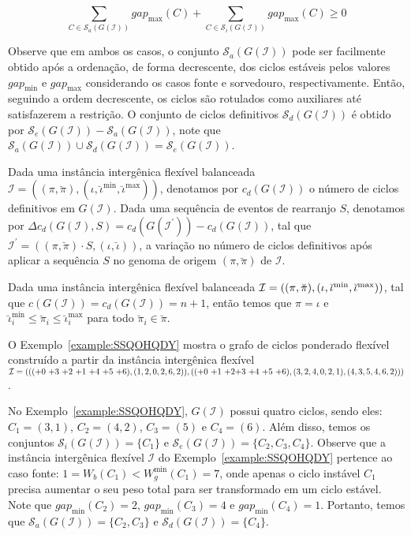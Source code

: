 $$\sum_{C \in \mathcal{S}_a(G(\mathcal{I}))} gap_{\max}(C) + \sum_{C \in \mathcal{S}_i(G(\mathcal{I}))} gap_{\max}(C) \ge 0$$

Observe que em ambos os casos, o conjunto $\mathcal{S}_a(G(\mathcal{I}))$ pode ser facilmente obtido após a ordenação, de forma decrescente, dos ciclos estáveis pelos valores $gap_{\min}$ e $gap_{\max}$ considerando os casos fonte e sorvedouro, respectivamente. Então, seguindo a ordem decrescente, os ciclos são rotulados como auxiliares até satisfazerem a restrição. O conjunto de ciclos definitivos $\mathcal{S}_d(G(\mathcal{I}))$ é obtido por $\mathcal{S}_e(G(\mathcal{I})) - \mathcal{S}_a(G(\mathcal{I}))$, note que $\mathcal{S}_a(G(\mathcal{I})) \cup \mathcal{S}_d(G(\mathcal{I})) = \mathcal{S}_e(G(\mathcal{I}))$.

Dada uma instância intergênica flexível balanceada $\mathcal{I} = ((\pi,\breve\pi),(\iota,\breve\iota^{\min},\breve\iota^{\max}))$, denotamos por $c_d(G(\mathcal{I}))$ o número de ciclos definitivos em $G(\mathcal{I})$. Dada uma sequência de eventos de rearranjo $S$, denotamos por $\Delta c_d(G(\mathcal{I}), S) = c_d(G(\mathcal{I^{\prime}})) - c_d(G(\mathcal{I}))$, tal que $\mathcal{I^{\prime}} = ((\pi,\breve\pi) \cdot S,(\iota,\breve\iota))$, a variação no número de ciclos definitivos após aplicar a sequência $S$ no genoma de origem $(\pi,\breve\pi)$ de $\mathcal{I}$.

\begin{remark}\label{remark:HLVDQLCE}
Dada uma instância intergênica flexível balanceada $\mathcal{I} = ((\pi,\breve\pi),(\iota,\breve\iota^{\min},\break\breve\iota^{\max}))$, tal que $c(G(\mathcal{I})) = c_d(G(\mathcal{I})) = n+1$, então temos que $\pi = \iota$ e $\breve\iota^{\min}_i \le \breve\pi_i \le \breve\iota^{\max}_i$ para todo $\breve\pi_i \in \breve\pi$.
\end{remark}

O Exemplo~\ref{example:SSQOHQDY} mostra o grafo de ciclos ponderado flexível construído a partir da instância intergênica flexível $\mathcal{I} = ((({+0}~{+3}~{+2}~{+1}~{+4}~{+5}~{+6}),(1,2,0,2,6,2)),(({+0}~{+1}~{+2}\break{+3}~{+4}~{+5}~{+6}),(3,2,4,0,2,1),(4,3,5,4,6,2)))$.



No Exemplo~\ref{example:SSQOHQDY}, $G(\mathcal{I})$ possui quatro ciclos, sendo eles: $C_1 = (3,1)$, $C_2 = (4,2)$, $C_3 = (5)$ e $C_4=(6)$. Além disso, temos os conjuntos $\mathcal{S}_i(G(\mathcal{I})) = \{C_1\}$ e $\mathcal{S}_e(G(\mathcal{I})) = \{C_2,C_3,C_4\}$. Observe que a instância intergênica flexível $\mathcal{I}$ do Exemplo~\ref{example:SSQOHQDY} pertence ao caso fonte: $1 = W_b(C_1) < W^{\min}_g(C_1) = 7$, onde apenas o ciclo instável $C_1$ precisa aumentar o seu peso total para ser transformado em um ciclo estável. Note que $gap_{\min}(C_2) = 2$, $gap_{\min}(C_3) = 4$ e $gap_{\min}(C_4) = 1$. Portanto, temos que $\mathcal{S}_a(G(\mathcal{I})) = \{C_2, C_3\}$ e $\mathcal{S}_d(G(\mathcal{I})) = \{C_4\}$.


